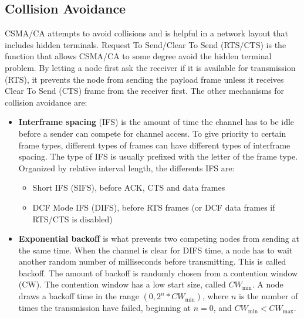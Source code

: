      \subsection{Collision Avoidance}
CSMA/CA attempts to avoid collisions and is helpful in a network layout that includes hidden terminals. Request To Send/Clear To Send (RTS/CTS)
	is the function that allows CSMA/CA to some degree avoid the hidden terminal problem. By letting a node first ask the receiver if it is
	available for transmission (RTS), it prevents the node from sending the payload frame unless it receives Clear To Send (CTS) frame from the receiver first.
	The other mechanisms for collision avoidance are: 
	\begin{itemize}	
	\item \textbf{Interframe spacing} (IFS) is the amount of time the channel has to be idle before a sender can compete for channel access. 
	To give priority to certain frame types, different types of frames can have different types of interframe spacing. The type of IFS is usually 
	prefixed with the letter of the frame type. Organized by relative interval length, the differents IFS are:
	\begin{itemize} 
	\item Short IFS (SIFS), before ACK,  CTS and data frames
	\item DCF Mode IFS (DIFS), before RTS frames (or DCF data frames if RTS/CTS is disabled)

	\end{itemize}
	\item \textbf{Exponential backoff} is what prevents two competing nodes from sending at the same time. When the channel is clear
	for DIFS time, a node has to wait another  random number of milliseconds before transmitting. This is called backoff.
	The amount of backoff is randomly chosen from a contention window (CW). The contention window has a low start size,
	called $CW_{\text{min}}$. A node draws a backoff time in the range $(0, 2^n*CW_{\text{min}})$, where $n$ is the number 
	of times the transmission have failed, beginning at $n=0$, and $CW_{\text{min}}<CW_{\text{max}}$.
	\end{itemize}


